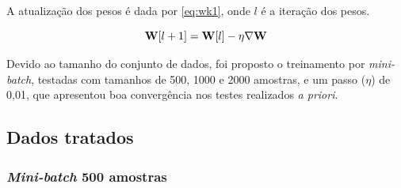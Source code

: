 A atualização dos pesos é dada por \eqref{eq:wk1}, onde $l$ é a iteração dos pesos.

\begin{equation}\label{eq:wk1}
	\mathbf{W}[l+1] = \mathbf{W}[l] - \eta\nabla\mathbf{W}
\end{equation}

Devido ao tamanho do conjunto de dados, foi proposto o treinamento por \textit{mini-batch}, testadas com tamanhos de 500, 1000 e 2000 amostras, e um passo ($\eta$) de 0,01, que apresentou boa convergência nos testes realizados \textit{a priori}.

\subsection{Dados tratados}

\subsubsection*{\textit{Mini-batch} 500 amostras}

